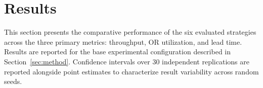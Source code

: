 \documentclass[sn-mathphys-num]{sn-jnl}
\begin{document}
    





\section{Results}\label{sec:results}

This section presents the comparative performance of the six evaluated
strategies across the three primary metrics: throughput, OR utilization,
and lead time. Results are reported for the base experimental
configuration described in Section~\ref{sec:method}. Confidence
intervals over 30 independent replications are reported alongside
point estimates to characterize result variability across random seeds.
\end{document}
